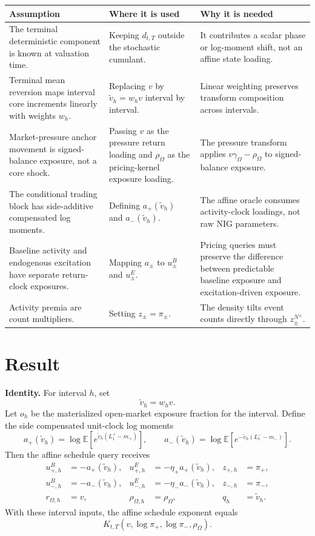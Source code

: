 \documentclass[11pt]{article}
\begin{document}
\begin{tabularx}{\textwidth}{XXX}
\toprule
Assumption & Where it is used & Why it is needed\\
\midrule
The terminal deterministic component is known at valuation time.
& Keeping \(d_{t,T}\) outside the stochastic cumulant.
& It contributes a scalar phase or log-moment shift, not an affine state loading.\\
Terminal mean reversion maps interval core increments linearly with weights \(w_h\).
& Replacing \(v\) by \(\tilde v_h=w_hv\) interval by interval.
& Linear weighting preserves transform composition across intervals.\\
Market-pressure anchor movement is signed-balance exposure, not a core shock.
& Passing \(v\) as the pressure return loading and \(\rho_\Omega\) as the pricing-kernel exposure loading.
& The pressure transform applies \(v\gamma_\Omega-\rho_\Omega\) to signed-balance exposure.\\
The conditional trading block has side-additive compensated log moments.
& Defining \(a_+(\tilde v_h)\) and \(a_-(\tilde v_h)\).
& The affine oracle consumes activity-clock loadings, not raw NIG parameters.\\
Baseline activity and endogenous excitation have separate return-clock exposures.
& Mapping \(a_\pm\) to \(u_\pm^B\) and \(u_\pm^E\).
& Pricing queries must preserve the difference between predictable baseline exposure and excitation-driven exposure.\\
Activity premia are count multipliers.
& Setting \(z_\pm=\pi_\pm\).
& The density tilts event counts directly through \(z_\pm^{N^\pm}\).\\
\bottomrule
\end{tabularx}

\section{Result}

\noindent\textbf{Identity.} For interval \(h\), set
\[
    \tilde v_h=w_h v.
\]
Let \(o_h\) be the materialized open-market exposure fraction for the interval.
Define the side compensated unit-clock log moments
\[
    a_+(\tilde v_h)
    =
    \log\mathbb E\!\left[e^{\tilde v_h(L_1^+-m_+)}\right],
    \qquad
    a_-(\tilde v_h)
    =
    \log\mathbb E\!\left[e^{-\tilde v_h(L_1^--m_-)}\right].
\]
Then the affine schedule query receives
\[
    \begin{aligned}
        u_{+,h}^B&=-a_+(\tilde v_h),
        &
        u_{+,h}^E&=-\eta_+a_+(\tilde v_h),
        &
        z_{+,h}&=\pi_+,
        \\
        u_{-,h}^B&=-a_-(\tilde v_h),
        &
        u_{-,h}^E&=-\eta_-a_-(\tilde v_h),
        &
        z_{-,h}&=\pi_-,
        \\
        r_{\Omega,h}&=v,
        &
        \rho_{\Omega,h}&=\rho_\Omega,
        &
        q_h&=\tilde v_h.
    \end{aligned}
\]
With these interval inputs, the affine schedule exponent equals
\[
    K_{t,T}(v,\log\pi_+,\log\pi_-,\rho_\Omega).
\]
\end{document}
